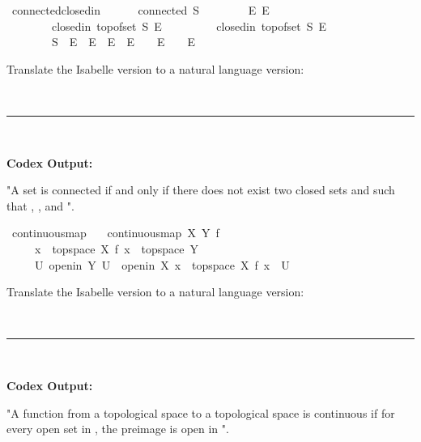 \documentclass{article}
\begin{document}
\begin{boxB}
\begin{isabelle}
\isamarkupfalse \ connected{\isacharunderscore}{\kern0pt}closedin{\isacharcolon}{\kern0pt}\isanewline
\ \ \ \ \ \ {\isachardoublequoteopen}connected\ S\ {\isasymlongleftrightarrow}\isanewline
\ \ \ \ \ \ \ {\isacharparenleft}{\kern0pt}{\isasymnexists}E{}\ E{}{\isachardot}{\kern0pt}\isanewline
\ \ \ \ \ \ \ \ closedin\ {\isacharparenleft}{\kern0pt}top{\isacharunderscore}{\kern0pt}of{\isacharunderscore}{\kern0pt}set\ S{\isacharparenright}{\kern0pt}\ E{}\ {\isasymand}\isanewline
\ \ \ \ \ \ \ \ closedin\ {\isacharparenleft}{\kern0pt}top{\isacharunderscore}{\kern0pt}of{\isacharunderscore}{\kern0pt}set\ S{\isacharparenright}{\kern0pt}\ E{}\ {\isasymand}\isanewline
\ \ \ \ \ \ \ \ S\ {\isasymsubseteq}\ E{}\ {\isasymunion}\ E{}\ {\isasymand}\ E{}\ {\isasyminter}\ E{}\ {\isacharequal}{\kern0pt}\ {\isacharbraceleft}{\kern0pt}{\isacharbraceright}{\kern0pt}\ {\isasymand}\ E{}\ {\isasymnoteq}\ {\isacharbraceleft}{\kern0pt}{\isacharbraceright}{\kern0pt}\ {\isasymand}\ E{}\ {\isasymnoteq}\ {\isacharbraceleft}{\kern0pt}{\isacharbraceright}{\kern0pt}{\isacharparenright}{\kern0pt}{\isachardoublequoteclose}
\end{isabelle}
Translate the Isabelle version to a natural language version:

\
\hrule
\

\textbf{Codex Output:}

"A set  is connected if and only if there does not exist two closed sets  and  such that , ,  and ".
\end{boxB}

\begin{boxB}
\begin{isabelle}
\isamarkupfalse \ continuous{\isacharunderscore}{\kern0pt}map\ \isanewline
\ \ {\isachardoublequoteopen}continuous{\isacharunderscore}{\kern0pt}map\ X\ Y\ f\ {\isasymequiv}\isanewline
\ \ \ \ \ {\isacharparenleft}{\kern0pt}{\isasymforall}x\ {\isasymin}\ topspace\ X{\isachardot}{\kern0pt}\ f\ x\ {\isasymin}\ topspace\ Y{\isacharparenright}{\kern0pt}\ {\isasymand}\isanewline
\ \ \ \ \ {\isacharparenleft}{\kern0pt}{\isasymforall}U{\isachardot}{\kern0pt}\ openin\ Y\ U\ {\isasymlongrightarrow}\ openin\ X\ {\isacharbraceleft}{\kern0pt}x\ {\isasymin}\ topspace\ X{\isachardot}{\kern0pt}\ f\ x\ {\isasymin}\ U{\isacharbraceright}{\kern0pt}{\isacharparenright}{\kern0pt}{\isachardoublequoteclose}
\end{isabelle}
Translate the Isabelle version to a natural language version:

\
\hrule
\

\textbf{Codex Output:}

"A function  from a topological space  to a topological space  is continuous if for every open set  in , the preimage  is open in ". 
\end{boxB}
\end{document}
